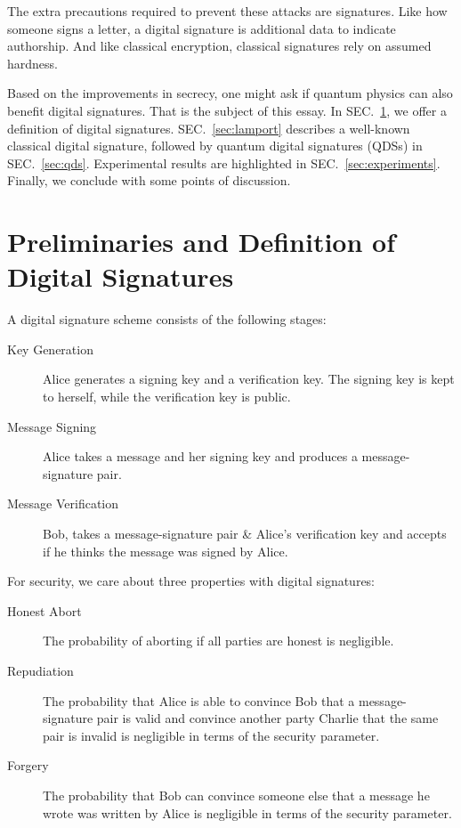 \documentclass[%
 reprint,
 amsmath,amssymb,
 aps,
 pra,
]{revtex4-1}
\begin{document}
The extra precautions required to prevent these attacks are signatures. Like how someone signs a letter, a digital signature is additional data to indicate authorship. And like classical encryption, classical signatures rely on assumed hardness.

Based on the improvements in secrecy, one might ask if quantum physics can also benefit digital signatures. That is the subject of this essay. In SEC.\ \ref{sec:def}, we offer a definition of digital signatures. SEC.\ \ref{sec:lamport} describes a well-known classical digital signature, followed by quantum digital signatures (QDSs) in SEC.\ \ref{sec:qds}. Experimental results are highlighted in SEC.\ \ref{sec:experiments}. Finally, we conclude with some points of discussion.

\section{Preliminaries and Definition of Digital Signatures}
\label{sec:def}

A digital signature scheme consists of the following stages:

\begin{description}
\item[Key Generation]Alice generates a signing key and a verification key. The signing key is kept to herself, while the verification key is public.
\item[Message Signing]Alice takes a message and her signing key and produces a message-signature pair.
\item[Message Verification]Bob, takes a message-signature pair \& Alice's verification key and accepts if he thinks the message was signed by Alice.
\end{description}

For security, we care about three properties with digital signatures:

\begin{description}
\item[Honest Abort]The probability of aborting if all parties are honest is negligible.
\item[Repudiation]The probability that Alice is able to convince Bob that a message-signature pair is valid and convince another party Charlie that the same pair is invalid is negligible in terms of the security parameter.
\item[Forgery]The probability that Bob can convince someone else that a message he wrote was written by Alice is negligible in terms of the security parameter.
\end{description}
\end{document}
